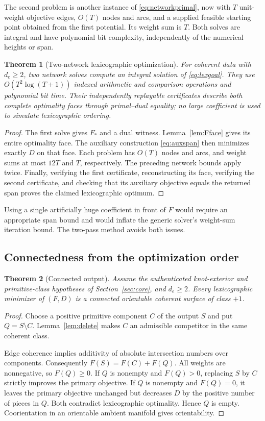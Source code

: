 \documentclass[11pt,letterpaper]{article}
\newtheorem{theorem}{Theorem}[section]
\theoremstyle{definition}
\newcommand{\Fmin}{F_*}
\begin{document}
The second problem is another instance of \eqref{eq:networkprimal}, now with $T$ unit-weight objective edges, $O(T)$ nodes and arcs, and a supplied feasible starting point obtained from the first potential. Its weight sum is $T$. Both solves are integral and have polynomial bit complexity, independently of the numerical heights or span.

\begin{theorem}[Two-network lexicographic optimization]\label{thm:twoflows}
For coherent data with $d_e\geq2$, two network solves compute an integral solution of \eqref{eq:lexgoal}. They use $O(T^2\log(T+1))$ indexed arithmetic and comparison operations and polynomial bit time. Their independently replayable certificates describe both complete optimality faces through primal--dual equality; no large coefficient is used to simulate lexicographic ordering.
\end{theorem}
\begin{proof}
The first solve gives $\Fmin$ and a dual witness. Lemma~\ref{lem:Fface} gives its entire optimality face. The auxiliary construction \eqref{eq:auxspan} then minimizes exactly $D$ on that face. Each problem has $O(T)$ nodes and arcs, and weight sums at most $12T$ and $T$, respectively. The preceding network bounds apply twice. Finally, verifying the first certificate, reconstructing its face, verifying the second certificate, and checking that its auxiliary objective equals the returned span proves the claimed lexicographic optimum.
\end{proof}

Using a single artificially huge coefficient in front of $F$ would require an appropriate span bound and would inflate the generic solver's weight-sum iteration bound. The two-pass method avoids both issues.

\subsection{Connectedness from the optimization order}
\begin{theorem}[Connected output]\label{thm:lexconnected}
Assume the authenticated knot-exterior and primitive-class hypotheses of Section~\ref{sec:core}, and $d_e\geq2$. Every lexicographic minimizer of $(F,D)$ is a connected orientable coherent surface of class $+1$.
\end{theorem}
\begin{proof}
Choose a positive primitive component $C$ of the output $S$ and put $Q=S\setminus C$. Lemma~\ref{lem:delete} makes $C$ an admissible competitor in the same coherent class.

Edge coherence implies additivity of absolute intersection numbers over components. Consequently $F(S)=F(C)+F(Q)$. All weights are nonnegative, so $F(Q)\geq0$. If $Q$ is nonempty and $F(Q)>0$, replacing $S$ by $C$ strictly improves the primary objective. If $Q$ is nonempty and $F(Q)=0$, it leaves the primary objective unchanged but decreases $D$ by the positive number of pieces in $Q$. Both contradict lexicographic optimality. Hence $Q$ is empty. Coorientation in an orientable ambient manifold gives orientability.
\end{proof}
\end{document}

